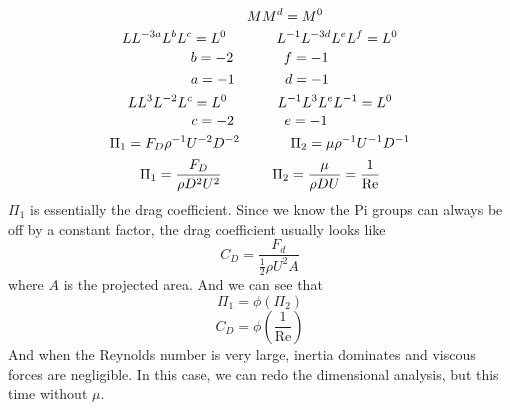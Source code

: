 \begin{example}
\begin{equation*}
    \hspace{0.5in}
    MM^{d}=M^{0}
  \end{equation*}
  \begin{equation*}
    LL^{-3a}L^{b}L^{c}=L^{0}
    \hspace{0.5in}
    L^{-1}L^{-3d}L^{e}L^{f}=L^{0}
  \end{equation*}
  \begin{equation*}
    b=-2
    \hspace{0.5in}
    f=-1
  \end{equation*}
  \begin{equation*}
    a=-1
    \hspace{0.5in}
    d=-1
  \end{equation*}
  \begin{equation*}
    LL^{3}L^{-2}L^{c}=L^{0}
    \hspace{0.5in}
    L^{-1}L^{3}L^{e}L^{-1}=L^{0}
  \end{equation*}
  \begin{equation*}
    c=-2
    \hspace{0.5in}
    e=-1
  \end{equation*}
  \begin{equation*}
    \Pi_{1}=F_{D}\rho^{-1}U^{-2}D^{-2}
    \hspace{0.5in}
    \Pi_{2}=\mu\rho^{-1}U^{-1}D^{-1}
  \end{equation*}
  \begin{equation*}
    \Pi_{1}=\frac{F_{D}}{\rho{}D^{2}U^{2}}
    \hspace{0.5in}
    \Pi_{2}=\frac{\mu}{\rho{}DU}=\frac{1}{\text{Re}}
  \end{equation*}
  $\Pi_{1}$ is essentially the drag coefficient.
  Since we know the Pi groups can always be off by a constant factor, the drag coefficient usually looks like
  \begin{equation*}
    C_{D}=\frac{F_{d}}{\frac{1}{2}\rho{}U^{2}A}
  \end{equation*}
  where $A$ is the projected area.
  And we can see that
  \begin{equation*}
    \Pi_{1}=\phi\left(\Pi_{2}\right)
  \end{equation*}
  \begin{equation*}
    C_{D}=\phi\left(\frac{1}{\text{Re}}\right)
  \end{equation*}
  And when the Reynolds number is very large, inertia dominates and viscous forces are negligible.
  In this case, we can redo the dimensional analysis, but this time without $\mu$.

\end{example}
